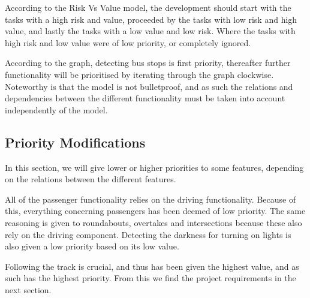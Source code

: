 According to the Risk Vs Value model, the development should start with the tasks with a high risk and value, proceeded by the tasks with low risk and high value, and lastly the tasks with a low value and low risk. Where the tasks with high risk and low value were of low priority, or completely ignored. 

According to the graph, detecting bus stops is first priority, thereafter further functionality will be prioritised by iterating through the graph clockwise. Noteworthy is that the model is not bulletproof, and as such the relations and dependencies between the different functionality must be taken into account independently of the model.

\subsection{Priority Modifications}

In this section, we will give lower or higher priorities to some features, depending on the relations between the different features.

All of the passenger functionality relies on the driving functionality. Because of this, everything concerning passengers has been deemed of low priority. The same reasoning is given to roundabouts, overtakes and intersections because these also rely on the driving component. Detecting the darkness for turning on lights is also given a low priority based on its low value.

Following the track is crucial, and thus has been given the highest value, and as such has the highest priority. From this we find the project requirements in the next section.
